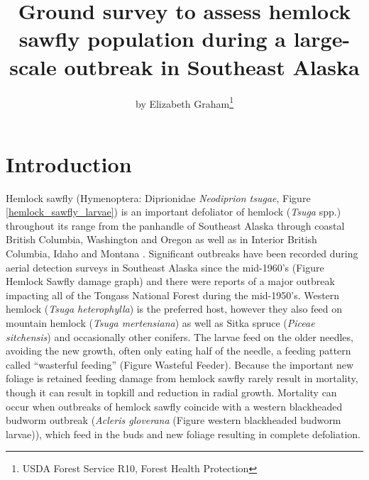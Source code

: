 ﻿\title{Ground survey to assess hemlock sawfly population during a large-scale outbreak in Southeast Alaska}

\subtitle{}

\author{by Elizabeth Graham\footnote{USDA Forest Service R10, Forest Health Protection}}

\maketitle

\section{Introduction}

Hemlock sawfly (Hymenoptera: Diprionidae \textit{Neodiprion tsugae}, Figure \ref{hemlock_sawfly_larvae}) is an important defoliator of hemlock (\textit{Tsuga} spp.)  throughout its range from the panhandle of Southeast Alaska through coastal British Columbia, Washington and Oregon as well as in Interior British Columbia, Idaho and Montana \citep{Hardetal1976}.  Significant outbreaks have been recorded during aerial detection surveys in Southeast Alaska since the mid-1960’s (Figure Hemlock Sawfly damage graph) and there were reports of a major outbreak impacting all of the Tongass National Forest during the mid-1950’s. Western hemlock (\textit{Tsuga heterophylla}) is the preferred host, however they also feed on mountain hemlock (\textit{Tsuga mertensiana}) as well as Sitka spruce (\textit{Piceae sitchensis}) and occasionally other conifers.  The larvae feed on the older needles, avoiding the new growth, often only eating half of the needle, a feeding pattern called “wasterful feeding” (Figure Wasteful Feeder).  Because the important new foliage is retained feeding damage from hemlock sawfly rarely result in mortality, though it can result in topkill and reduction in radial growth.  Mortality can occur when outbreaks of hemlock sawfly coincide with a western blackheaded budworm outbreak (\textit{Acleris gloverana} (Figure western blackheaded budworm larvae)), which feed in the buds and new foliage resulting in complete defoliation. 

